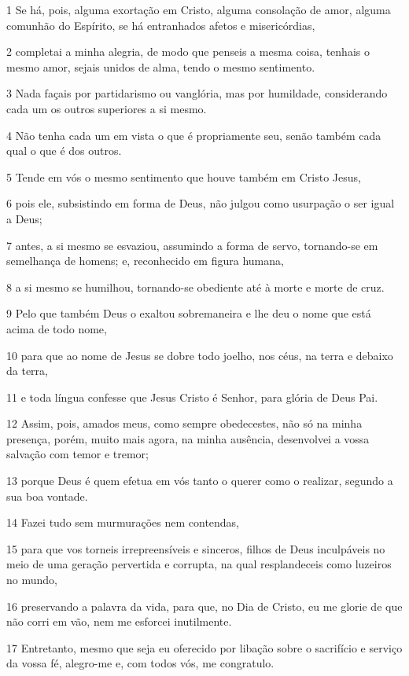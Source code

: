 \par 1 Se há, pois, alguma exortação em Cristo, alguma consolação de amor, alguma comunhão do Espírito, se há entranhados afetos e misericórdias,
\par 2 completai a minha alegria, de modo que penseis a mesma coisa, tenhais o mesmo amor, sejais unidos de alma, tendo o mesmo sentimento.
\par 3 Nada façais por partidarismo ou vanglória, mas por humildade, considerando cada um os outros superiores a si mesmo.
\par 4 Não tenha cada um em vista o que é propriamente seu, senão também cada qual o que é dos outros.
\par 5 Tende em vós o mesmo sentimento que houve também em Cristo Jesus,
\par 6 pois ele, subsistindo em forma de Deus, não julgou como usurpação o ser igual a Deus;
\par 7 antes, a si mesmo se esvaziou, assumindo a forma de servo, tornando-se em semelhança de homens; e, reconhecido em figura humana,
\par 8 a si mesmo se humilhou, tornando-se obediente até à morte e morte de cruz.
\par 9 Pelo que também Deus o exaltou sobremaneira e lhe deu o nome que está acima de todo nome,
\par 10 para que ao nome de Jesus se dobre todo joelho, nos céus, na terra e debaixo da terra,
\par 11 e toda língua confesse que Jesus Cristo é Senhor, para glória de Deus Pai.
\par 12 Assim, pois, amados meus, como sempre obedecestes, não só na minha presença, porém, muito mais agora, na minha ausência, desenvolvei a vossa salvação com temor e tremor;
\par 13 porque Deus é quem efetua em vós tanto o querer como o realizar, segundo a sua boa vontade.
\par 14 Fazei tudo sem murmurações nem contendas,
\par 15 para que vos torneis irrepreensíveis e sinceros, filhos de Deus inculpáveis no meio de uma geração pervertida e corrupta, na qual resplandeceis como luzeiros no mundo,
\par 16 preservando a palavra da vida, para que, no Dia de Cristo, eu me glorie de que não corri em vão, nem me esforcei inutilmente.
\par 17 Entretanto, mesmo que seja eu oferecido por libação sobre o sacrifício e serviço da vossa fé, alegro-me e, com todos vós, me congratulo.
